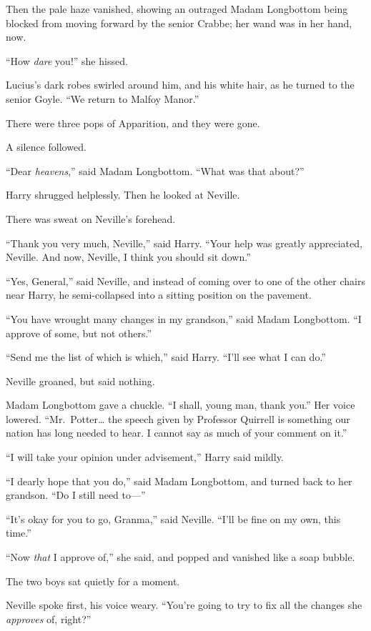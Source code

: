 Then the pale haze vanished, showing an outraged Madam Longbottom being
blocked from moving forward by the senior Crabbe; her wand was in her
hand, now.

``How \emph{dare} you!'' she hissed.

Lucius's dark robes swirled around him, and his white hair, as he turned
to the senior Goyle. ``We return to Malfoy Manor.''

There were three pops of Apparition, and they were gone.

A silence followed.

``Dear \emph{heavens},'' said Madam Longbottom. ``What was that about?''

Harry shrugged helplessly. Then he looked at Neville.

There was sweat on Neville's forehead.

``Thank you very much, Neville,'' said Harry. ``Your help was greatly
appreciated, Neville. And now, Neville, I think you should sit down.''

``Yes, General,'' said Neville, and instead of coming over to one of the
other chairs near Harry, he semi-collapsed into a sitting position on
the pavement.

``You have wrought many changes in my grandson,'' said Madam Longbottom.
``I approve of some, but not others.''

``Send me the list of which is which,'' said Harry. ``I'll see what I
can do.''

Neville groaned, but said nothing.

Madam Longbottom gave a chuckle. ``I shall, young man, thank you.'' Her
voice lowered. ``Mr.~Potter\ldots{} the speech given by Professor
Quirrell is something our nation has long needed to hear. I cannot say
as much of your comment on it.''

``I will take your opinion under advisement,'' Harry said mildly.

``I dearly hope that you do,'' said Madam Longbottom, and turned back to
her grandson. ``Do I still need to---''

``It's okay for you to go, Granma,'' said Neville. ``I'll be fine on my
own, this time.''

``Now \emph{that} I approve of,'' she said, and popped and vanished like
a soap bubble.

The two boys sat quietly for a moment.

Neville spoke first, his voice weary. ``You're going to try to fix all
the changes she \emph{approves} of, right?''

